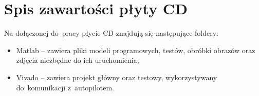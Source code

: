 \appendix
\chapter{Spis zawartości płyty CD}
Na dołączonej do~pracy płycie CD znajdują się następujące foldery:
\begin{itemize}
	\item Matlab -- zawiera pliki modeli programowych, testów, obróbki obrazów oraz zdjęcia niezbędne do ich uruchomienia,
	\item Vivado -- zawiera projekt główny oraz testowy, wykorzystywany do~komunikacji z~autopilotem.
\end{itemize}
